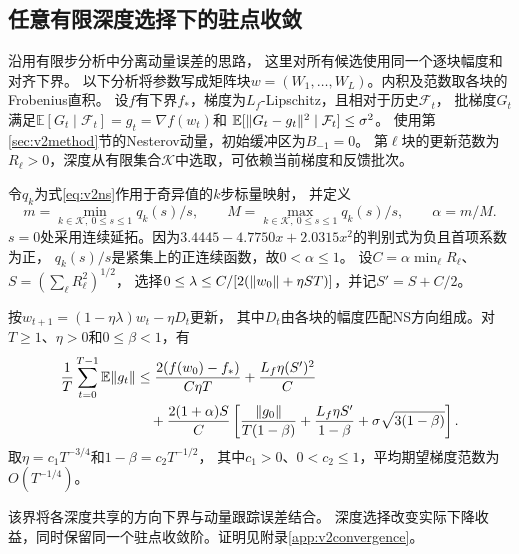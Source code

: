 \subsection{任意有限深度选择下的驻点收敛}\label{sec:v2convergence}
沿用有限步分析中分离动量误差的思路\cite{wang2026practical,peng2026finitens}，
这里对所有候选使用同一个逐块幅度和对齐下界。
以下分析将参数写成矩阵块$w=(W_1,\ldots,W_L)$。内积及范数取各块的Frobenius直积。
设$f$有下界$f_*$，梯度为$L_f$-Lipschitz，且相对于历史$\mathcal F_t$，
批梯度$G_t$满足$\mathbb E[G_t\mid\mathcal F_t]=g_t=\nabla f(w_t)$和
$\mathbb E[\lVert G_t-g_t\rVert^2\mid\mathcal F_t]\le\sigma^2$。
使用第\ref{sec:v2method}节的Nesterov动量，初始缓冲区为$B_{-1}=0$。
第$\ell$块的更新范数为$R_\ell>0$，深度从有限集合$\mathcal K$中选取，可依赖当前梯度和反馈批次。

令$q_k$为式\eqref{eq:v2ns}作用于奇异值的$k$步标量映射，
并定义
\[
 m=\min_{k\in\mathcal K,\ 0\le s\le1} q_k(s)/s,\qquad
 M=\max_{k\in\mathcal K,\ 0\le s\le1} q_k(s)/s,\qquad
 \alpha=m/M.
\]
$s=0$处采用连续延拓。因为$3.4445-4.7750 x+2.0315 x^2$的判别式为负且首项系数为正，
$q_k(s)/s$是紧集上的正连续函数，故$0<\alpha\le1$。
设$C=\alpha\min_\ell R_\ell$、$S=(\sum_\ell R_\ell^2)^{1/2}$，
选择$0\le\lambda\le C/[2(\lVert w_0\rVert+\eta ST)]$，并记$S'=S+C/2$。

\begin{theorem}[幅度匹配有限NS的有限步界]\label{thm:v2convergence}
按$w_{t+1}=(1-\eta\lambda)w_t-\eta D_t$更新，
其中$D_t$由各块的幅度匹配NS方向组成。对$T\ge1$、$\eta>0$和$0\le\beta<1$，有
\begin{align}
 \frac1T\sum_{t=0}^{T-1}\mathbb E\lVert g_t\rVert
 &\le \frac{2(f(w_0)-f_*)}{C\eta T}
     +\frac{L_f\eta (S')^2}{C} \nonumber\\
 &\quad+\frac{2(1+\alpha)S}{C}\left[
       \frac{\lVert g_0\rVert}{T(1-\beta)}
       +\frac{L_f\eta S'}{1-\beta}
       +\sigma\sqrt{3(1-\beta)}\right].
\end{align}
取$\eta=c_1T^{-3/4}$和$1-\beta=c_2T^{-1/2}$，
其中$c_1>0$、$0<c_2\le1$，平均期望梯度范数为$O(T^{-1/4})$。
\end{theorem}

该界将各深度共享的方向下界与动量跟踪误差结合。
深度选择改变实际下降收益，同时保留同一个驻点收敛阶。证明见附录\ref{app:v2convergence}。
